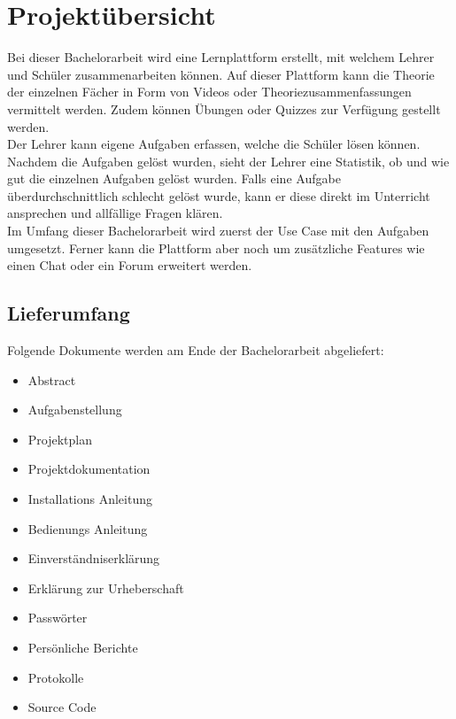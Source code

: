 \section{Projektübersicht}
Bei dieser Bachelorarbeit wird eine Lernplattform erstellt, mit welchem Lehrer und Schüler zusammenarbeiten können. Auf dieser Plattform kann die Theorie der einzelnen Fächer in Form von Videos oder Theoriezusammenfassungen vermittelt werden. Zudem können Übungen oder Quizzes zur Verfügung gestellt werden. \\
Der Lehrer kann eigene Aufgaben erfassen, welche die Schüler lösen können. Nachdem die Aufgaben gelöst wurden, sieht der Lehrer eine Statistik, ob und wie gut die einzelnen Aufgaben gelöst wurden. Falls eine Aufgabe überdurchschnittlich schlecht gelöst wurde, kann er diese direkt im Unterricht ansprechen und allfällige Fragen klären. \\
Im Umfang dieser Bachelorarbeit wird zuerst der Use Case mit den Aufgaben umgesetzt. Ferner kann die Plattform aber noch um zusätzliche Features wie einen Chat oder ein Forum erweitert werden.




\subsection{Lieferumfang}
Folgende Dokumente werden am Ende der Bachelorarbeit abgeliefert:
\begin{itemize}
	\itemsep0em
	\item Abstract
	\item Aufgabenstellung
	\item Projektplan
	\item Projektdokumentation
	\item Installations Anleitung
	\item Bedienungs Anleitung
	\item Einverständniserklärung
	\item Erklärung zur Urheberschaft
	\item Passwörter
	\item Persönliche Berichte
	\item Protokolle
	\item Source Code	
\end{itemize}

\newpage